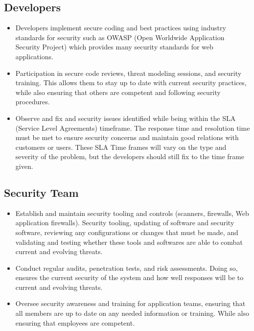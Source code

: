 \subsection{Developers}
\begin{itemize}
    \item Developers implement secure coding and best practices using industry standards for security such as OWASP (Open Worldwide Application Security Project) which provides many security standards for web applications.
    \item Participation in secure code reviews, threat modeling sessions, and security training. This allows them to stay up to date with current security practices, while also ensuring that others are competent and following security procedures.
    \item Observe and fix and security issues identified while being within the SLA (Service Level Agreements) timeframe. The response time and resolution time must be met to ensure security concerns and maintain good relations with customers or users. These SLA Time frames will vary on the type and severity of the problem, but the developers should still fix to the time frame given.
\end{itemize}
\subsection{Security Team}
\begin{itemize}
    \item Establish and maintain security tooling and controls (scanners, firewalls, Web application firewalls).  Security tooling, updating of software and security software, reviewing any configurations or changes that must be made, and validating and testing whether these tools and softwares are able to combat current and evolving threats.
    \item Conduct regular audits, penetration tests, and risk assessments. Doing so, ensures the current security of the system and how well responses will be to current and evolving threats.
    \item Oversee security awareness and training for application teams, ensuring that all members are up to date on any needed information or training. While also ensuring that employees are competent.
\end{itemize}
